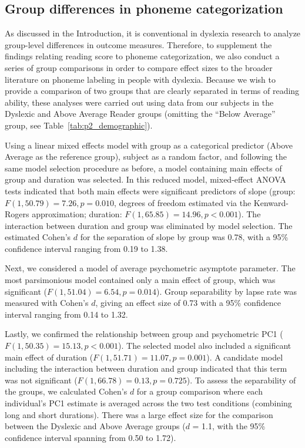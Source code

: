 \documentclass[../uwthesis.tex]{subfiles}
\begin{document}
\subsection{Group differences in phoneme categorization}
As discussed in the Introduction, it is conventional in dyslexia research to analyze group-level differences in outcome measures. Therefore, to supplement the findings relating reading score to phoneme categorization, we also conduct a series of group comparisons in order to compare effect sizes to the broader literature on phoneme labeling in people with dyslexia. Because we wish to provide a comparison of two groups that are clearly separated in terms of reading ability, these analyses were carried out using data from our subjects in the Dyslexic and Above Average Reader groups (omitting the “Below Average” group, see Table~\ref{tab:p2_demographic}). 
 
Using a linear mixed effects model with group as a categorical predictor (Above Average as the reference group), subject as a random factor, and following the same model selection procedure as before, a model containing main effects of group and duration was selected. In this reduced model, mixed-effect ANOVA tests indicated that both main effects were significant predictors of slope (group: $F(1,50.79) = 7.26, p = 0.010$, degrees of freedom estimated via the Kenward-Rogers approximation; duration: $F(1,65.85) = 14.96, p < 0.001$). The interaction between duration and group was eliminated by model selection. The estimated Cohen’s $d$ for the separation of slope by group was 0.78, with a 95\% confidence interval ranging from 0.19 to 1.38.

Next, we considered a model of average psychometric asymptote parameter. The most parsimonious model contained only a main effect of group, which was significant ($F(1, 51.04) = 6.54, p = 0.014$). Group separability by lapse rate was measured with Cohen’s $d$, giving an effect size of 0.73 with a 95\% confidence interval ranging from 0.14 to 1.32.

Lastly, we confirmed the relationship between group and psychometric PC1 ($F(1,50.35)  = 15.13, p < 0.001$). The selected model also included a significant main effect of duration ($F(1,51.71)  = 11.07, p = 0.001$). A candidate model including the interaction between duration and group indicated that this term was not significant ($F(1,66.78) = 0.13, p = 0.725$). To assess the separability of the groups, we calculated Cohen’s $d$ for a group comparison where each individual’s PC1 estimate is averaged across the two test conditions (combining long and short durations). There was a large effect size for the comparison between the Dyslexic and Above Average groups ($d$ = 1.1, with the 95\% confidence interval spanning from 0.50 to 1.72).
\end{document}
